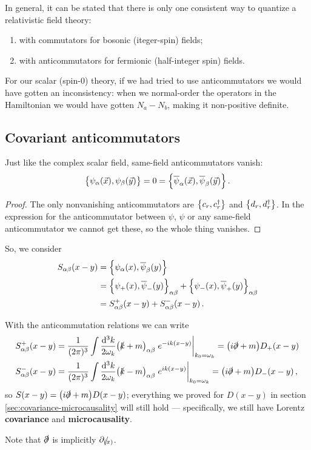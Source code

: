 \documentclass[main.tex]{subfiles}
\begin{document}
In general, it can be stated that there is only one consistent way to quantize a relativistic field theory: 
\begin{enumerate}
    \item with commutators for bosonic (iteger-spin) fields;
    \item with anticommutators for fermionic (half-integer spin) fields.
\end{enumerate}

For our scalar (spin-0) theory, if we had tried to use anticommutators we would have gotten an inconsistency: when we normal-order the operators in the Hamiltonian we would have gotten \(N_a - N_b\), making it non-positive definite. 

\subsection{Covariant anticommutators}

\begin{claim}
Just like the complex scalar field, same-field anticommutators vanish: 
%
\begin{align}
\qty{\psi_{\alpha }(\vec{x}), \psi_{\beta }(\vec{y})} = 0 = \qty{\overline{\psi}_{\alpha }(\vec{x}), \overline{\psi}_{\beta }(\vec{y})}
\,.
\end{align}
\end{claim}

\begin{proof}
The only nonvanishing anticommutators are \(\qty{c_r , c_r ^\dag}\) and \(\qty{d_r, d_r ^\dag}\). In the expression for the anticommutator between \(\psi \), \(\psi \) or any same-field anticommutator we cannot get these, so the whole thing vanishes. 
\end{proof}

So, we consider 
%
\begin{align}
S_{\alpha \beta } (x-y) &= \qty{ \psi_{\alpha }(x), \overline{\psi}_{\beta }(y)}  \\
&= \qty{\psi_{+}(x), \overline{\psi}_{-}(y)}_{\alpha \beta } + 
\qty{\psi_{-}(x), \overline{\psi}_{+}(y)}_{\alpha \beta }  \\
&= S_{\alpha \beta }^{+}(x-y) + S_{\alpha \beta }^{-} (x-y)
\,.
\end{align}

With the anticommutation relations we can write 
%
\begin{align}
S^{+}_{\alpha \beta }(x-y) &= \frac{1}{(2 \pi )^3}
\int \frac{ \dd[3]{k}}{2 \omega_{k}}
\qty(\slashed{k} + m)_{\alpha \beta } \eval{e^{-ik(x-y)} }_{k_0 = \omega_{k}} = \qty(i \slashed{\partial} + m) D_+ (x-y)\\
S^{-}_{\alpha \beta }(x-y) &= \frac{1}{(2 \pi )^3}
\int \frac{ \dd[3]{k}}{2 \omega_{k}}
\qty(\slashed{k} - m)_{\alpha \beta } \eval{e^{ik(x-y)} }_{k_0 = \omega_{k}}
=\qty(i \slashed{\partial} + m) D_- (x-y)
\,,
\end{align}
%
so \(S(x-y) = \qty(i \slashed{\partial} + m )D(x-y) \); everything we proved for \(D(x-y)\) in section \ref{sec:covariance-microcausality} will still hold --- specifically, we still have Lorentz \textbf{covariance} and \textbf{microcausality}. 

Note that \(\slashed{\partial}\) is implicitly \(\slashed{\partial_{(x)}}\). 
\end{document}

